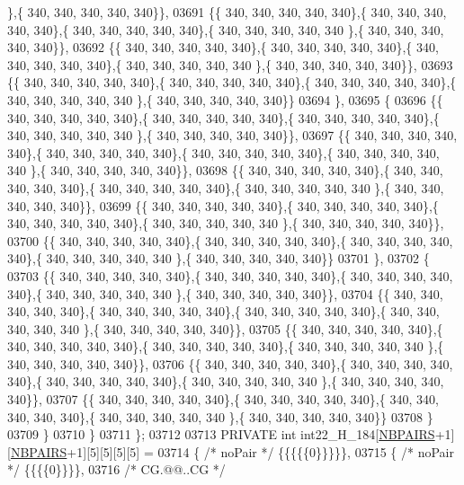 \begin{DoxyCode}
      \},\{ 340, 340, 340, 340, 340\}\},
03691 \{\{ 340, 340, 340, 340, 340\},\{ 340, 340, 340, 340, 340\},\{ 340, 340, 340, 340, 340\},\{ 340, 340, 340, 340, 340
      \},\{ 340, 340, 340, 340, 340\}\},
03692 \{\{ 340, 340, 340, 340, 340\},\{ 340, 340, 340, 340, 340\},\{ 340, 340, 340, 340, 340\},\{ 340, 340, 340, 340, 340
      \},\{ 340, 340, 340, 340, 340\}\},
03693 \{\{ 340, 340, 340, 340, 340\},\{ 340, 340, 340, 340, 340\},\{ 340, 340, 340, 340, 340\},\{ 340, 340, 340, 340, 340
      \},\{ 340, 340, 340, 340, 340\}\}
03694 \},
03695 \{
03696 \{\{ 340, 340, 340, 340, 340\},\{ 340, 340, 340, 340, 340\},\{ 340, 340, 340, 340, 340\},\{ 340, 340, 340, 340, 340
      \},\{ 340, 340, 340, 340, 340\}\},
03697 \{\{ 340, 340, 340, 340, 340\},\{ 340, 340, 340, 340, 340\},\{ 340, 340, 340, 340, 340\},\{ 340, 340, 340, 340, 340
      \},\{ 340, 340, 340, 340, 340\}\},
03698 \{\{ 340, 340, 340, 340, 340\},\{ 340, 340, 340, 340, 340\},\{ 340, 340, 340, 340, 340\},\{ 340, 340, 340, 340, 340
      \},\{ 340, 340, 340, 340, 340\}\},
03699 \{\{ 340, 340, 340, 340, 340\},\{ 340, 340, 340, 340, 340\},\{ 340, 340, 340, 340, 340\},\{ 340, 340, 340, 340, 340
      \},\{ 340, 340, 340, 340, 340\}\},
03700 \{\{ 340, 340, 340, 340, 340\},\{ 340, 340, 340, 340, 340\},\{ 340, 340, 340, 340, 340\},\{ 340, 340, 340, 340, 340
      \},\{ 340, 340, 340, 340, 340\}\}
03701 \},
03702 \{
03703 \{\{ 340, 340, 340, 340, 340\},\{ 340, 340, 340, 340, 340\},\{ 340, 340, 340, 340, 340\},\{ 340, 340, 340, 340, 340
      \},\{ 340, 340, 340, 340, 340\}\},
03704 \{\{ 340, 340, 340, 340, 340\},\{ 340, 340, 340, 340, 340\},\{ 340, 340, 340, 340, 340\},\{ 340, 340, 340, 340, 340
      \},\{ 340, 340, 340, 340, 340\}\},
03705 \{\{ 340, 340, 340, 340, 340\},\{ 340, 340, 340, 340, 340\},\{ 340, 340, 340, 340, 340\},\{ 340, 340, 340, 340, 340
      \},\{ 340, 340, 340, 340, 340\}\},
03706 \{\{ 340, 340, 340, 340, 340\},\{ 340, 340, 340, 340, 340\},\{ 340, 340, 340, 340, 340\},\{ 340, 340, 340, 340, 340
      \},\{ 340, 340, 340, 340, 340\}\},
03707 \{\{ 340, 340, 340, 340, 340\},\{ 340, 340, 340, 340, 340\},\{ 340, 340, 340, 340, 340\},\{ 340, 340, 340, 340, 340
      \},\{ 340, 340, 340, 340, 340\}\}
03708 \}
03709 \}
03710 \}
03711 \};
03712 
03713 PRIVATE \textcolor{keywordtype}{int} int22\_H\_184[\hyperlink{energy__const_8h_a5e75221c779d618eab81e096f37e32ce}{NBPAIRS}+1][\hyperlink{energy__const_8h_a5e75221c779d618eab81e096f37e32ce}{NBPAIRS}+1][5][5][5][5] =
03714 \{ \textcolor{comment}{/* noPair */} \{\{\{\{\{0\}\}\}\}\},
03715 \{ \textcolor{comment}{/* noPair */} \{\{\{\{0\}\}\}\},
03716 \textcolor{comment}{/* CG.@@..CG */}

\end{DoxyCode}

